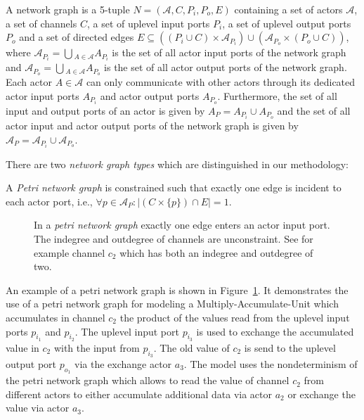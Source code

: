 \begin{definition}
A network graph is a 5-tuple $N=(\mathcal{A},C,P_{i},P_{o},E)$ containing
a set of actors $\mathcal{A}$, a set of channels $C$, a set of uplevel
input ports $P_{i}$, a set of uplevel output ports $P_{o}$ and a set of
directed edges $E \subseteq ((P_{i} \cup C) \times \mathcal{A}_{P_{i}})
\cup (\mathcal{A}_{P_{o}} \times (P_{o} \cup C))$, where
$\mathcal{A}_{P_{i}} = \bigcup{}_{A \in \mathcal{A}} A_{P_{i}}$
is the set of all actor input ports of the network graph and
$\mathcal{A}_{P_{o}} = \bigcup{}_{A \in \mathcal{A}} A_{P_{o}}$
is the set of all actor output ports of the network graph.
Each actor $A \in \mathcal{A}$ can only communicate with other actors
through its dedicated actor input ports $A_{P_{i}}$ and
actor output ports $A_{P_{o}}$.
Furthermore, the set of all input and output ports of an actor
is given by $A_{P} = A_{P_{i}} \cup A_{P_{o}}$ and
the set of all actor input and actor output ports of the network graph
is given by $\mathcal{A}_{P} = \mathcal{A}_{P_{i}} \cup \mathcal{A}_{P_{o}}$.

\end{definition}

There are two \emph{network graph types} which are distinguished in our methodology:

\begin{definition}\label{petri-network-graph}
  A \emph{Petri network graph} is constrained such that exactly
  one edge is incident to each actor port,
  i.e., $\forall{p \in \mathcal{A}_{P}}: |(C \times \{p\}) \cap E| = 1$.
\end{definition}

\begin{figure}
\centering

\caption{\label{ng-petri}In a \emph{petri network graph} exactly
  one edge enters an actor input port. The
  indegree and outdegree of channels are
  unconstraint. See for example channel $c_2$
  which has both an indegree and outdegree of
  two.}
\end{figure}

  An example of a petri network graph is shown in Figure~\ref{ng-petri}.
  It demonstrates the use of a petri network graph for modeling
  a Multiply-Accumulate-Unit which accumulates in channel $c_2$ the product of
  the values read from the uplevel input ports $p_{i_1}$ and $p_{i_2}$.
  The uplevel input port $p_{i_3}$ is used to exchange the
  accumulated value in $c_2$ with the input from $p_{i_3}$. The
  old value of $c_2$ is send to the uplevel output port $p_{o_1}$
  via the exchange actor $a_3$. The model uses the nondeterminism
  of the petri network graph which allows to read the value of channel
  $c_2$ from different actors to either accumulate additional
  data via actor $a_2$ or exchange the value via actor $a_3$.

